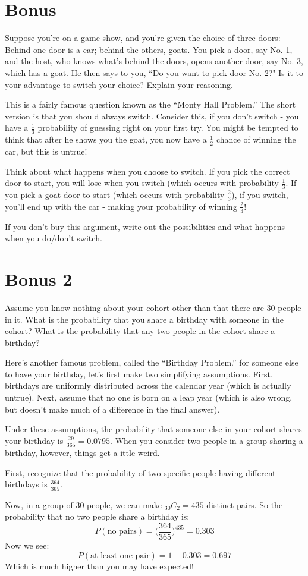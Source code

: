 \documentclass[11pt]{article}
\theoremstyle{definition}
\theoremstyle{remark}
\begin{document}
\section*{Bonus}
Suppose you're on a game show, and you're given the choice of three doors: Behind one door is a car; behind the others, goats. You pick a door, say No. 1, and the host, who knows what's behind the doors, opens another door, say No. 3, which has a goat. He then says to you, ``Do you want to pick door No. 2?" Is it to your advantage to switch your choice?  Explain your reasoning.

{\color{red} This is a fairly famous question known as the ``Monty Hall Problem.'' The short version is that you should always switch. Consider this, if you don't switch - you have a $\frac{1}{3}$ probability of guessing right on your first try. You might be tempted to think that after he shows you the goat, you now have a $\frac{1}{2}$ chance of winning the car, but this is untrue!

Think about what happens when you choose to switch. If you pick the correct door to start, you will lose when you switch (which occurs with probability $\frac{1}{3}$. If you pick a goat door to start (which occurs with probability $\frac{2}{3}$), if you switch, you'll end up with the car - making your probability of winning $\frac{2}{3}$!

If you don't buy this argument, write out the possibilities and what happens when you do/don't switch. 
}
\section*{Bonus 2}
Assume you know nothing about your cohort other than that there are 30 people in it.  What is the probability that you share a birthday with someone in the cohort?  What is the probability that any two people in the cohort share a birthday?

{\color{red} Here's another famous problem, called the ``Birthday Problem.'' for someone else to have your birthday, let's first make two simplifying assumptions. First, birthdays are uniformly distributed across the calendar year (which is actually untrue). Next, assume that no one is born on a leap year (which is also wrong, but doesn't make much of a difference in the final answer).

Under these assumptions, the probability that someone else in your cohort shares your birthday is $\frac{29}{365} = 0.0795$. When you consider two people in a group sharing a birthday, however, things get a ittle weird.

First, recognize that the probability of two specific people having different birthdays is $\frac{364}{365}$.

Now, in a group of 30 people, we can make $_{30}C_2 = 435$ distinct pairs. So the probability that no two people share a birthday is:
$$P(\text{no pairs}) = \bigg(\frac{364}{365}\bigg)^{435} = 0.303$$
Now we see:
$$P(\text{at least one pair}) = 1 - 0.303 = 0.697 $$
Which is much higher than you may have expected!}
\end{document}

